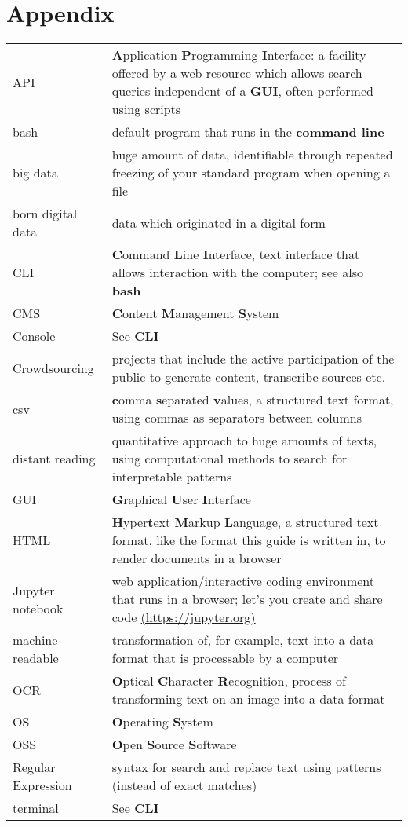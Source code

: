 \documentclass[
  letterpaper,
]{book}
\begin{document}
\hypertarget{appendix}{%
\chapter{Appendix}\label{appendix}}

\begin{longtable}[]{@{}
  >{\raggedright\arraybackslash}p{}
  >{\raggedright\arraybackslash}p{}@{}}
\toprule()
\endhead
API & \textbf{A}pplication \textbf{P}rogramming \textbf{I}nterface: a
facility offered by a web resource which allows search queries
independent of a \textbf{GUI}, often performed using scripts \\
bash & default program that runs in the \textbf{command line} \\
big data & huge amount of data, identifiable through repeated freezing
of your standard program when opening a file \\
born digital data & data which originated in a digital form \\
CLI & \textbf{C}ommand \textbf{L}ine \textbf{I}nterface, text interface
that allows interaction with the computer; see also \textbf{bash} \\
CMS & \textbf{C}ontent \textbf{M}anagement \textbf{S}ystem \\
Console & See \textbf{CLI} \\
Crowdsourcing & projects that include the active participation of the
public to generate content, transcribe sources etc. \\
csv & \textbf{c}omma \textbf{s}eparated \textbf{v}alues, a structured
text format, using commas as separators between columns \\
distant reading & quantitative approach to huge amounts of texts, using
computational methods to search for interpretable patterns \\
GUI & \textbf{G}raphical \textbf{U}ser \textbf{I}nterface \\
HTML & \textbf{H}yper\textbf{t}ext \textbf{M}arkup \textbf{L}anguage, a
structured text format, like the format this guide is written in, to
render documents in a browser \\
Jupyter notebook & web application/interactive coding environment that
runs in a browser; let's you create and share code
\href{https://jupyter.org}{(https://jupyter.org)} \\
machine readable & transformation of, for example, text into a data
format that is processable by a computer \\
OCR & \textbf{O}ptical \textbf{C}haracter \textbf{R}ecognition, process
of transforming text on an image into a data format \\
OS & \textbf{O}perating \textbf{S}ystem \\
OSS & \textbf{O}pen \textbf{S}ource \textbf{S}oftware \\
Regular Expression & syntax for search and replace text using patterns
(instead of exact matches) \\
terminal & See \textbf{CLI} \\
\bottomrule()
\end{longtable}
\end{document}
